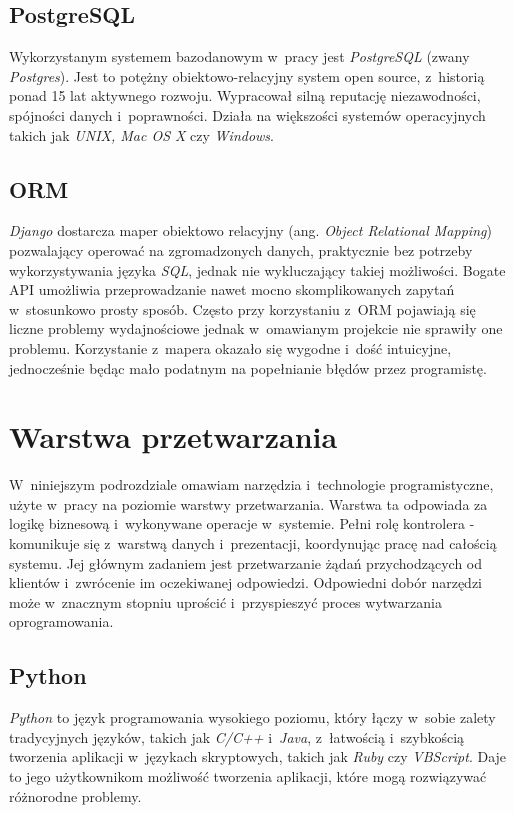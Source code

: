 \documentclass[a4paper,12pt,oneside]{mwrep}  %
\begin{document}
\subsection{PostgreSQL}
Wykorzystanym systemem bazodanowym w~pracy jest \emph{PostgreSQL} (zwany \emph{Postgres}). Jest to potężny obiektowo-relacyjny system open source, z~historią ponad 15 lat aktywnego rozwoju. Wypracował silną reputację niezawodności, spójności danych i~poprawności. Działa na większości systemów operacyjnych takich jak \emph{UNIX, Mac OS X} czy \emph{Windows}.

\subsection{ORM}
\emph{Django} dostarcza maper obiektowo relacyjny (ang. \emph{Object Relational Mapping}) pozwalający operować na zgromadzonych danych, praktycznie bez potrzeby wykorzystywania języka \emph{SQL}, jednak nie wykluczający takiej możliwości. Bogate API umożliwia przeprowadzanie nawet mocno skomplikowanych zapytań w~stosunkowo prosty sposób. Często przy korzystaniu z~ORM pojawiają się liczne problemy wydajnościowe jednak w~omawianym projekcie nie sprawiły one problemu. Korzystanie z~mapera okazało się wygodne i~dość intuicyjne, jednocześnie będąc mało podatnym na popełnianie błędów przez programistę.

\section{Warstwa przetwarzania}
W~niniejszym podrozdziale omawiam narzędzia i~technologie programistyczne, użyte w~pracy na poziomie warstwy przetwarzania. Warstwa ta odpowiada za logikę biznesową i~wykonywane operacje w~systemie. Pełni rolę kontrolera - komunikuje się z~warstwą danych i~prezentacji, koordynując pracę nad całością systemu. Jej głównym zadaniem jest przetwarzanie żądań przychodzących od klientów i~zwrócenie im oczekiwanej odpowiedzi. Odpowiedni dobór narzędzi może w~znacznym stopniu uprościć i~przyspieszyć proces wytwarzania oprogramowania.

\subsection{Python}
\emph{Python} to język programowania wysokiego poziomu, który łączy w~sobie zalety tradycyjnych języków, takich jak \emph{C/C++} i~\emph{Java}, z~łatwością i~szybkością tworzenia aplikacji w~językach skryptowych, takich jak \emph{Ruby} czy \emph{VBScript}. Daje to jego użytkownikom możliwość tworzenia aplikacji, które mogą rozwiązywać różnorodne problemy. %
\end{document}
